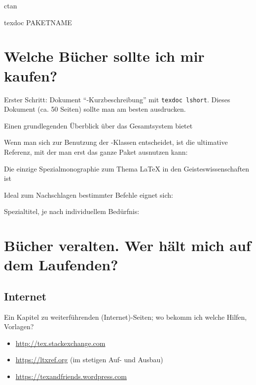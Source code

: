 
ctan


texdoc PAKETNAME


\section{Welche Bücher sollte ich mir kaufen?}

Erster Schritt: Dokument \enquote{\LaTeXe -Kurzbeschreibung} mit 
\lstinline/texdoc lshort/. Dieses Dokument (ca. 50 Seiten) sollte man am besten ausdrucken.

Einen grundlegenden Überblick über das Gesamtsystem bietet
\cite{voss:einfuehrung}

Wenn man sich zur Benutzung der \KOMAScript-Klassen entscheidet, ist die ultimative Referenz,
mit der man erst das ganze Paket ausnutzen kann:
\cite{kohm:2014}

Die einzige Spezialmonographie zum Thema \LaTeX{} in den Geisteswissenschaften ist
\cite{rouquette:2012}

Ideal zum Nachschlagen bestimmter Befehle eignet sich:
\cite{voss:referenz}

Spezialtitel, je nach individuellem Bedürfnis:

\cite{voss:praesentationen}

\cite{voss:bibliografien}

\cite{voss:pstricks}


\section{Bücher veralten. Wer hält mich auf dem Laufenden?}

\subsection{Internet}
Ein Kapitel zu weiterführenden (Internet)-Seiten; wo bekomm ich welche Hilfen, Vorlagen?

\begin{itemize}
    \item \url{http://tex.stackexchange.com}
    \item \url{https://ltxref.org} (im stetigen Auf- und Ausbau)
\end{itemize}


\begin{itemize}
    \item \url{https://texandfriends.wordpress.com}
\end{itemize}


